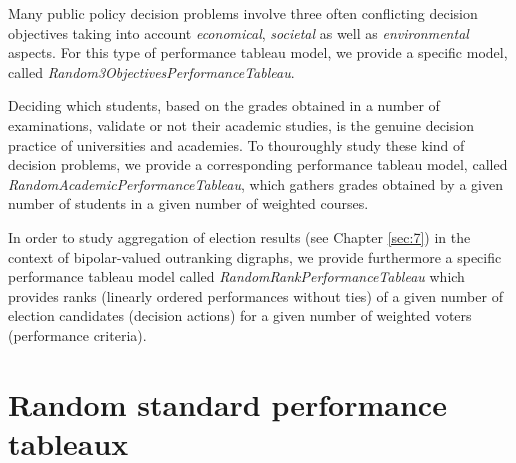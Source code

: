 Many public policy decision problems involve three often conflicting decision objectives taking into account \emph{economical}, \emph{societal} as well as \emph{environmental} aspects. For this type of performance tableau model, we provide a specific model, called \emph{Random3ObjectivesPerformanceTableau}.

Deciding which students, based on the grades obtained in a number of examinations, validate or not their academic studies, is the genuine decision practice of universities and academies. To thouroughly study these kind of decision problems, we provide a corresponding performance tableau model, called \emph{RandomAcademicPerformanceTableau}, which gathers grades obtained by a given number of students in a given number of weighted courses.    

In order to study aggregation of election results (see Chapter \ref{sec:7}) in the context of bipolar-valued outranking digraphs, we provide furthermore a specific performance tableau model called \emph{RandomRankPerformanceTableau} which provides ranks (linearly ordered performances without ties) of a given number of election candidates (decision actions) for a given number of weighted voters (performance criteria).
 
\section{Random standard performance tableaux}
\label{sec:6.2}
    
